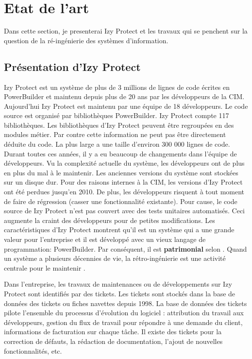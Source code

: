 \documentclass[a4paper]{article}
\begin{document}
\section{Etat de l'art}
\label{sec:stateOfTheArt}
Dans cette section, je presenterai Izy Protect et les travaux qui se penchent sur la question de la ré-ingénierie des systèmes d'information.
\subsection{Présentation d'Izy Protect}
\label{sec:izyProtect}
Izy Protect est un système de plus de 3 millions de lignes de code écrites en PowerBuilder et maintenu depuis plus de 20 ans par les développeurs de la CIM. 
Aujourd'hui Izy Protect est maintenu par une équipe de 18 développeurs.
 Le code source est organisé par bibliothèques PowerBuilder. 
Izy Protect compte 117 bibliothèques. Les bibliothèques d'Izy Protect peuvent être regroupées en des modules métier.
 Par contre cette information ne peut pas être directement déduite du code.
 La plus large a une taille d'environ 300 000 lignes de code.
Durant toutes ces années, il y a eu beaucoup de changements dans l'équipe de développeurs. 
Vu la complexité actuelle du système, les développeurs ont de plus en plus du mal à le maintenir.
Les anciennes versions du système sont stockées sur un disque dur.
 Pour des raisons internes à la CIM, les versions d'Izy Protect ont été perdues jusqu'en 2010. 
 De plus, les développeurs risquent à tout moment de faire de régression (casser une fonctionnalité existante). 
Pour cause, le code source de Izy Protect  n'est pas couvert avec des tests unitaires automatisés.
Ceci augmente la craint des développeurs pour de petites modifications. 
Les caractéristiques d'Izy Protect montrent qu'il est un système qui a une grande valeur pour l'entreprise et 
 il est développé avec un vieux langage de programmation: PowerBuilder. 
Par conséquent, il est  \textbf{patrimonial} selon \citet{Deme02a}.
Quand un système a plusieurs décennies de vie, la rétro-ingénierie est une activité centrale pour le maintenir \cite{Deme02a}.

Dans l'entreprise, les travaux de maintenances ou de développements sur Izy Protect sont identifiés par des tickets.
Les tickets sont stockés dans la base de données des tickets ou fiches navettes depuis 1998. 
La base de données des tickets pilote l'ensemble du processus d'évolution du logiciel : attribution du travail aux développeurs, gestion du flux de travail pour répondre à une demande du client, informations de facturation sur chaque tâche.
Il existe des tickets pour la correction de défauts, la rédaction de documentation, l'ajout de nouvelles fonctionnalités, etc. 
\end{document}
